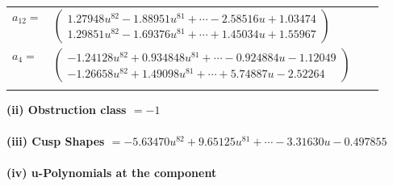 \documentclass[1p]{elsarticle_modified}
\theoremstyle{definition}
\begin{document}
\begin{tabular}{m{7pt} m{180pt} m{7pt} m{180pt} }
\flushright $a_{12}=$&$\begin{pmatrix}1.27948 u^{82}-1.88951 u^{81}+\cdots-2.58516 u+1.03474\\1.29851 u^{82}-1.69376 u^{81}+\cdots+1.45034 u+1.55967\end{pmatrix}$ \\
\flushright $a_{4}=$&$\begin{pmatrix}-1.24128 u^{82}+0.934848 u^{81}+\cdots-0.924884 u-1.12049\\-1.26658 u^{82}+1.49098 u^{81}+\cdots+5.74887 u-2.52264\end{pmatrix}$\\&\end{tabular}
\flushleft \textbf{(ii) Obstruction class $= -1$}\\~\\
\flushleft \textbf{(iii) Cusp Shapes $= -5.63470 u^{82}+9.65125 u^{81}+\cdots-3.31630 u-0.497855$}\\~\\
\newpage\renewcommand{\arraystretch}{1}
\flushleft \textbf{(iv) u-Polynomials at the component}\newline \\
\end{document}
